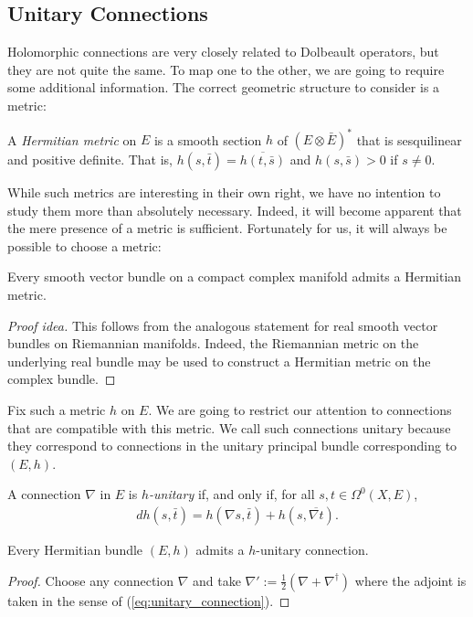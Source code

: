 \documentclass[12pt]{ociamthesis}  %
\begin{document}
\subsection{Unitary Connections}

Holomorphic connections are very closely related to Dolbeault operators,
but they are not quite the same. To map one to the other, we are going
to require some additional information. The correct geometric
structure to consider is a metric:

\begin{definition}
  A \emph{Hermitian metric} on $E$ is a smooth section $h$ of
  $(E\otimes\bar E)^*$ that is sesquilinear and positive definite.
  That is, $h(s,\bar t) = \overline{h(t,\bar s)}$ and $h(s,\bar s) > 0$
  if $s \neq 0$.
\end{definition}

While such metrics are interesting in their own right, we have no
intention to study them more than absolutely necessary. Indeed, it will
become apparent that the mere presence of a metric is sufficient.
Fortunately for us, it will always be possible to choose a metric:

\begin{lemma}\label{thm:hermitian_structures_exist}
  Every smooth vector bundle on a compact complex manifold admits a
  Hermitian metric.
  \begin{proof}[Proof idea]
    This follows from the analogous statement for real smooth vector
    bundles on Riemannian manifolds. Indeed, the Riemannian metric on
    the underlying real bundle may be used to construct a Hermitian
    metric on the complex bundle.
  \end{proof}
\end{lemma}

Fix such a metric $h$ on $E$. We are going to restrict our attention to
connections that are compatible with this metric. We call such
connections unitary because they correspond to connections
in the unitary principal bundle corresponding to $(E,h)$.

\begin{definition}
  A connection $\nabla$ in $E$ is \emph{$h$-unitary}
  if, and only if, for all $s,t\in\Omega^0(X,E)$,
  \begin{align}\label{eq:unitary_connection}
    dh(s,\bar t) = h(\nabla s,\bar t) + h(s,\overline{\nabla t}).
  \end{align}
\end{definition}

\begin{lemma}
  Every Hermitian bundle $(E,h)$ admits a $h$-unitary connection.
  \begin{proof}
    Choose any connection $\nabla$ and take
    $\nabla' := \frac{1}{2}(\nabla + \nabla^\dagger)$
    where the adjoint is taken in the sense of
    (\ref{eq:unitary_connection}).
  \end{proof}
\end{lemma}
\end{document}

